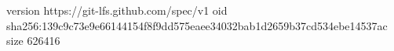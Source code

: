 version https://git-lfs.github.com/spec/v1
oid sha256:139c9c73e9e66144154f8f9dd575eaee34032bab1d2659b37cd534ebe14537ac
size 626416
